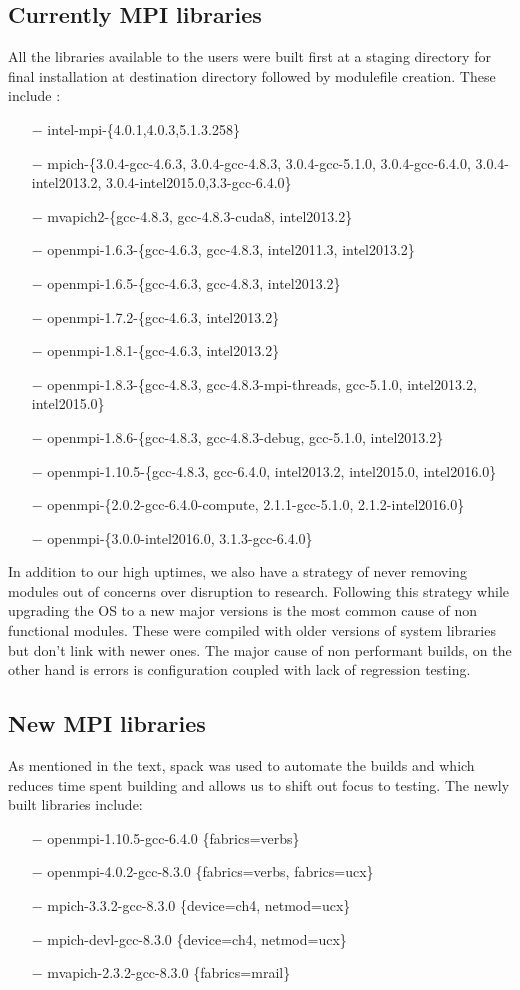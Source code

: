 \documentclass[sigconf,authordraft]{acmart}
\begin{document}
\subsection{Currently MPI libraries}
All the libraries available to the users were built first at a staging directory
for final installation at destination directory followed by modulefile creation. These include :
\begin{itemize}
	\item[$-$] intel-mpi-\{4.0.1,4.0.3,5.1.3.258\}
	\item[$-$] mpich-\{3.0.4-gcc-4.6.3, 3.0.4-gcc-4.8.3, 3.0.4-gcc-5.1.0, 	3.0.4-gcc-6.4.0, 3.0.4-intel2013.2, 3.0.4-intel2015.0,3.3-gcc-6.4.0\}
	\item[$-$]mvapich2-\{gcc-4.8.3, gcc-4.8.3-cuda8, intel2013.2\}
	\item[$-$]openmpi-1.6.3-\{gcc-4.6.3, gcc-4.8.3, intel2011.3, intel2013.2\}
	\item[$-$]openmpi-1.6.5-\{gcc-4.6.3, gcc-4.8.3, intel2013.2\}
	\item[$-$]openmpi-1.7.2-\{gcc-4.6.3, intel2013.2\}		\item[$-$]openmpi-1.8.1-\{gcc-4.6.3, intel2013.2\}
	\item[$-$]openmpi-1.8.3-\{gcc-4.8.3, gcc-4.8.3-mpi-threads, gcc-5.1.0, 	intel2013.2, intel2015.0\}
	\item[$-$]openmpi-1.8.6-\{gcc-4.8.3, gcc-4.8.3-debug, gcc-5.1.0, intel2013.2\}
	\item[$-$]openmpi-1.10.5-\{gcc-4.8.3, gcc-6.4.0, intel2013.2, intel2015.0, intel2016.0\}
	\item[$-$]openmpi-\{2.0.2-gcc-6.4.0-compute, 2.1.1-gcc-5.1.0, 2.1.2-intel2016.0\}
	\item[$-$]openmpi-\{3.0.0-intel2016.0, 3.1.3-gcc-6.4.0\}
\end{itemize} 
In addition to our high uptimes, we also have a strategy of never removing modules out of concerns over disruption to research. Following this strategy while upgrading the OS to a new major versions is the most common cause of non functional modules. These were compiled with older versions of system libraries but don't link with newer ones. The major cause of non performant builds, on the other hand is errors is configuration coupled with lack of regression testing.

\subsection{New MPI libraries}
As mentioned in the text, spack\cite{spack} was used to automate the builds and which reduces time spent building and allows us to shift out focus to testing.
The newly built libraries include:
\begin{itemize}
	\item[$-$] openmpi-1.10.5-gcc-6.4.0 \{fabrics=verbs\}
	\item[$-$] openmpi-4.0.2-gcc-8.3.0 \{fabrics=verbs, fabrics=ucx\}
	\item[$-$] mpich-3.3.2-gcc-8.3.0 \{device=ch4, netmod=ucx\}
	\item[$-$] mpich-devl-gcc-8.3.0 \{device=ch4, netmod=ucx\}
	\item[$-$] mvapich-2.3.2-gcc-8.3.0 \{fabrics=mrail\}
\end{itemize} 
\end{document}
